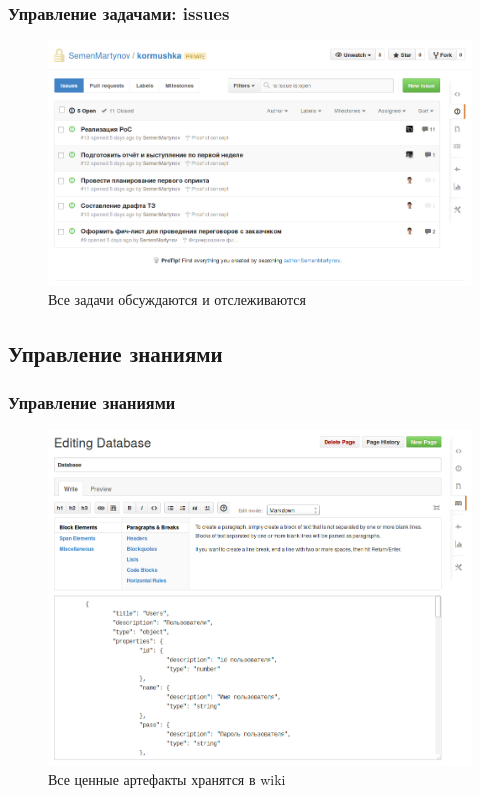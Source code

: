 \documentclass{beamer}
\begin{document}
\begin{frame}
\frametitle{Управление задачами: issues}

\begin{figure}
\includegraphics[scale=0.30]{res/r1_issues}
\caption{Все задачи обсуждаются и отслеживаются}
\end{figure}

\end{frame}



\subsection{Управление знаниями}

\begin{frame}
\frametitle{Управление знаниями}

\begin{figure}
\includegraphics[scale=0.25]{res/r1_wiki}
\caption{Все ценные артефакты хранятся в wiki}
\end{figure}

\end{frame}
\end{document}
